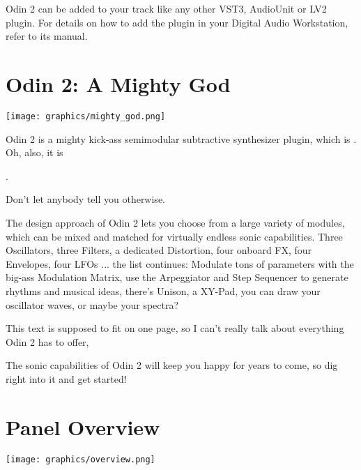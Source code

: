 \vspace{5mm}
Odin 2 can be added to your track like any other VST3, AudioUnit or LV2 plugin. For details on how to add the plugin in your Digital Audio Workstation, refer to its manual.

\clearpage
\section{Odin 2: A Mighty God}
\begin{center}
    \texttt{[image: graphics/mighty\_god.png]}
\end{center}

Odin 2 is a mighty kick-ass semimodular subtractive synthesizer plugin, which is . Oh, also, it is

\begin{center}
    .
\end{center}

Don't let anybody tell you otherwise. 

\vspace{1mm}
The design approach of Odin 2 lets you choose from a large variety of modules, which can be mixed and matched for virtually endless sonic capabilities. Three Oscillators, three Filters, a dedicated Distortion, four onboard FX, four Envelopes, four LFOs ... the list continues: Modulate tons of parameters with the big-ass Modulation Matrix, use the Arpeggiator and Step Sequencer to generate rhythms and musical ideas, there's Unison, a XY-Pad, you can draw your oscillator waves, or maybe your spectra?

\vspace{2mm}
This text is supposed to fit on one page, so I can't really talk about everything Odin 2 has to offer,

\begin{center}
\end{center}

The sonic capabilities of Odin 2 will keep you happy for years to come, so dig right into it and get started!

\clearpage
\section{Panel Overview}
\begin{center}
    \texttt{[image: graphics/overview.png]}
\end{center}

